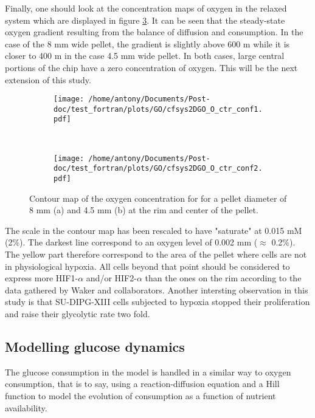 \documentclass[11pt,a4paper]{article}
\begin{document}
Finally, one should look at the concentration maps of oxygen in the relaxed system which are displayed in figure \ref{O_ctrmap}. It can be seen that the steady-state oxygen gradient resulting from the balance of diffusion and consumption. In the case of the 8 mm wide pellet, the gradient is slightly above 600 \textmu m while it is closer to 400 \textmu m in the case 4.5 mm wide pellet. In both cases, large central portions of the chip have a zero concentration of oxygen. This will be the next extension of this study.

\begin{figure}[ht!]
	\begin{subfigure}{0.45\textwidth}
	\centering
	\texttt{[image: /home/antony/Documents/Post-doc/test\_fortran/plots/GO/cfsys2DGO\_O\_ctr\_conf1.pdf]}
	\caption{ \label{O_ctr_conf1}}
	\end{subfigure}
	~~
	\begin{subfigure}{0.45\textwidth}
	\texttt{[image: /home/antony/Documents/Post-doc/test\_fortran/plots/GO/cfsys2DGO\_O\_ctr\_conf2.pdf]}
		\caption{ \label{O_ctr_conf2}}
	\end{subfigure}
	\caption{Contour map of the oxygen concentration for for a pellet diameter of 8 mm (a) and 4.5 mm (b) at the rim and center of the pellet. \label{O_ctrmap}}
\end{figure}

The scale in the contour map has been rescaled to have "saturate" at 0.015 mM (2\%). The darkest line correspond to an oxygen level of 0.002 mm ($\approx$ 0.2\%). The yellow part therefore correspond to the area of the pellet where cells are not in physiological hypoxia. All cells beyond that point should be considered to express more HIF1-$\alpha$ and/or HIF2-$\alpha$ than the ones on the rim according to the data gathered by Waker and collaborators. Another intersting observation in this study is that SU-DIPG-XIII cells subjected to hypoxia stopped their proliferation and raise their glycolytic rate two fold.\cite{Waker2018}

\subsection{Modelling glucose dynamics}
The glucose consumption in the model is handled in a similar way to oxygen consumption, that is to say, using a reaction-diffusion equation and a Hill  function to model the evolution of consumption as a function of nutrient availability.
\end{document}
